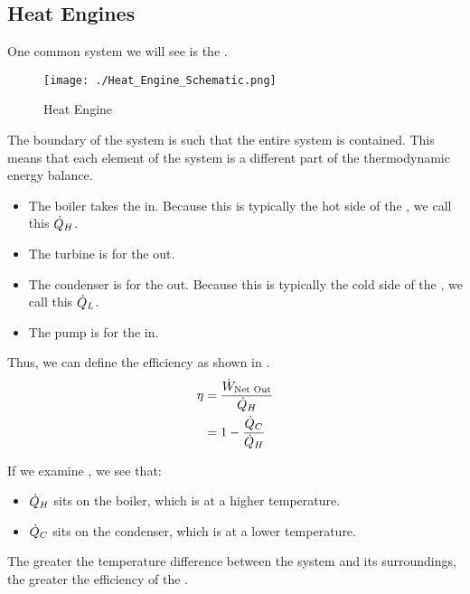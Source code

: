 \subsection{Heat Engines}\label{subsec:Heat_Engines}
One common system we will see is the .
\begin{figure}[h!tbp]
  \centering
  \texttt{[image: ./Heat\_Engine\_Schematic.png]}
  \caption{Heat Engine}
  \label{fig:Heat_Engine}
\end{figure}

The boundary of the system is such that the entire system is contained.
This means that each element of the system is a different part of the thermodynamic energy balance.
\begin{itemize}[noitemsep]
\item The boiler takes the  in.
  Because this is typically the hot side of the , we call this $\dot{Q}_{H}$.
\item The turbine is for the  out.
\item The condenser is for the  out.
  Because this is typically the cold side of the , we call this $\dot{Q}_{L}$.
\item The pump is for the  in.
\end{itemize}

Thus, we can define the efficiency as shown in .
\begin{equation}\label{eq:Energy_Efficiency-Heat_Engine}
  \begin{aligned}
    \eta &= \frac{\dot{W}_{\text{Net Out}}}{\dot{Q}_{H}} \\
    &= 1 - \frac{\dot{Q}_{C}}{\dot{Q}_{H}}
  \end{aligned}
\end{equation}

If we examine , we see that:
\begin{itemize}[noitemsep]
\item $\dot{Q}_{H}$ sits on the boiler, which is at a higher temperature.
\item $\dot{Q}_{C}$ sits on the condenser, which is at a lower temperature.
\end{itemize}
The greater the temperature difference between the system and its surroundings, the greater the efficiency of the .


